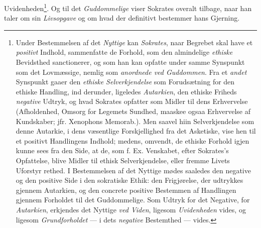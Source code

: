 Uvidenheden\footnote{Under Bestemmelsen af det \emph{Nyttige} kan
\emph{Sokrates}, naar Begrebet skal have et \emph{positivt} Indhold,
sammenfatte de Forhold, som den almindelige \emph{ethiske} Bevidsthed
sanctionerer, og som han kan opfatte under samme Synspunkt som det
Lovmæssige, nemlig som \emph{anordnede ved Guddommen}. Fra et
\emph{andet} Synspunkt gaaer den \emph{ethiske Selverkjendelse} som
Forudsætning for den ethiske Handling, ind derunder, ligeledes
\emph{Autarkien}, den ethiske Friheds \emph{negative} Udtryk, og hvad
Sokrates opfatter som Midler til dens Erhvervelse (Afholdenhed, Omsorg
for Legemets Sundhed, maaskee ogsaa Erhvervelse af Kundskaber; jfr.
Xenophons Memorab.). Men saavel hiin Selverkjendelse som denne Autarkie,
i dens væsentlige Forskjellighed fra det Asketiske, vise hen til et
positivt Handlingens Indhold; medens, omvendt, de ethiske Forhold igjen
kunne sees fra den Side, at de, som f. Ex. Venskabet, efter Sokrates's
Opfattelse, blive Midler til ethisk Selverkjendelse, eller fremme Livets
Uforstyr\-%
rethed. I Bestemmelsen af det Nyttige mødes saaledes den negative og
den positive Side i den sokratiske Ethik: den Frigjørelse, der udtrykkes
gjennem Autarkien, og den concrete positive Bestemmen af Handlingen
gjennem Forholdet til det Guddommelige. Som Udtryk for det Negative, for
\emph{Autarkien}, erkjendes det Nyttige \emph{ved Viden}, ligesom
\emph{Uvidenheden} vides, og ligesom \emph{Grundforholdet} --- i dets
\emph{negative} Bestemthed --- vides.}. Og til det \emph{Guddommelige} viser Sokrates
overalt tilbage, naar han taler om sin \emph{Livsopgave} og om
hvad der definitivt bestemmer hans Gjerning.

